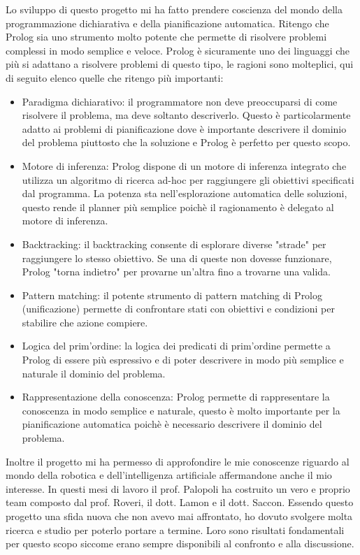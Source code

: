 Lo sviluppo di questo progetto mi ha fatto prendere coscienza del mondo della programmazione dichiarativa e della pianificazione automatica. 
Ritengo che Prolog sia uno strumento molto potente che permette di risolvere problemi complessi in modo semplice e veloce.
Prolog è sicuramente uno dei linguaggi che più si adattano a risolvere problemi di questo tipo, le ragioni sono molteplici, qui di seguito elenco quelle che ritengo più importanti:
\begin{itemize}
    \item Paradigma dichiarativo: il programmatore non deve preoccuparsi di come risolvere il problema, ma deve soltanto descriverlo. 
          Questo è particolarmente adatto ai problemi di pianificazione dove è importante descrivere il dominio del problema piuttosto che la soluzione e Prolog è perfetto per questo scopo.
    \item Motore di inferenza: Prolog dispone di un motore di inferenza integrato che utilizza un algoritmo di ricerca ad-hoc per raggiungere gli obiettivi specificati dal programma. 
          La potenza sta nell'esplorazione automatica delle soluzioni, questo rende il planner più semplice poichè il ragionamento è delegato al motore di inferenza.
    \item Backtracking: il backtracking consente di esplorare diverse "strade" per raggiungere lo stesso obiettivo. Se una di queste non dovesse funzionare, Prolog "torna indietro" per provarne un'altra fino a trovarne una valida.
    \item Pattern matching: il potente strumento di pattern matching di Prolog (unificazione) permette di confrontare stati con obiettivi e condizioni per stabilire che azione compiere.
    \item Logica del prim'ordine: la logica dei predicati di prim'ordine permette a Prolog di essere più espressivo e di poter descrivere in modo più semplice e naturale il dominio del problema.
    \item Rappresentazione della conoscenza: Prolog permette di rappresentare la conoscenza in modo semplice e naturale, questo è molto importante per la pianificazione automatica poichè è necessario descrivere il dominio del problema.
\end{itemize} 

Inoltre il progetto mi ha permesso di approfondire le mie conoscenze riguardo al mondo della robotica e dell'intelligenza artificiale affermandone anche il mio interesse. In questi mesi di lavoro il prof. Palopoli ha costruito un vero e proprio team composto dal prof. Roveri, il dott. Lamon e il dott. Saccon.
Essendo questo progetto una sfida nuova che non avevo mai affrontato, ho dovuto svolgere molta ricerca e studio per poterlo portare a termine. Loro sono risultati fondamentali per questo scopo siccome erano sempre disponibili al confronto e alla discussione.

